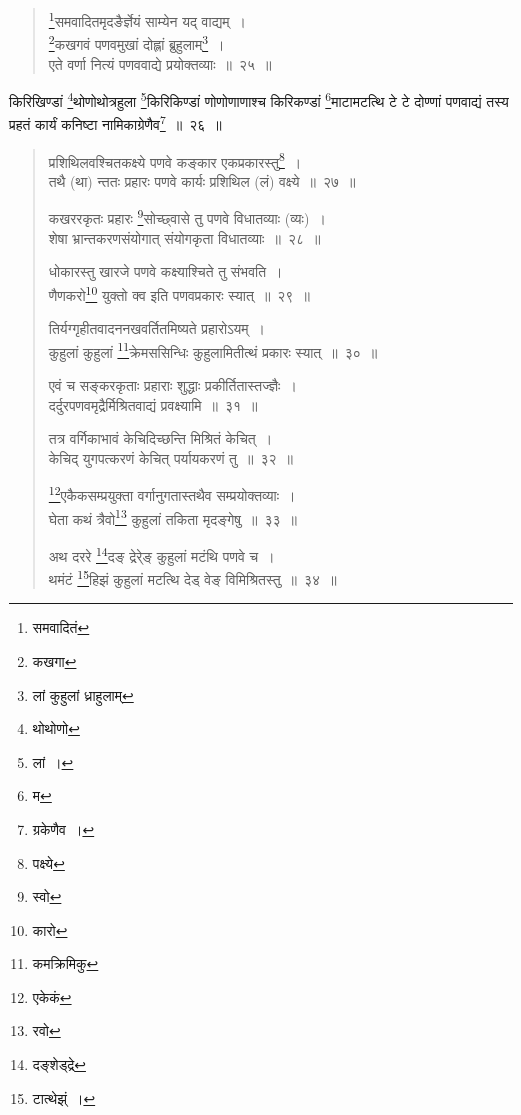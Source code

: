 \documentclass[11pt, openany]{book}
\begin{document}
\newpage

\begin{quote}
{\na \renewcommand{\thefootnote}{1}\footnote{समवादितं}समवादितमृदङैर्ज्ञेयं साम्येन यद् वाद्यम्~।\\
 \renewcommand{\thefootnote}{2}\footnote{कखगा}कखगवं पणवमुखां दोह्लां ब्रुहुलाम्\renewcommand{\thefootnote}{3}\footnote{लां कुहुलां ध्राहुलाम्}~।\\
 एते वर्णा नित्यं पणववाद्ये प्रयोक्तव्याः~॥~२५~॥}
\end{quote}

\noindent
{\qt किरिखिण्डां \renewcommand{\thefootnote}{4}\footnote{थोथोणो}थोणोथोत्रहुला \renewcommand{\thefootnote}{5}\footnote{लां~।}किरिकिण्डां णोणोणाणाश्च किरिकण्डां \renewcommand{\thefootnote}{6}\footnote{म}माटामटत्थि टे टे दोण्णां पणवाद्यं तस्य प्रहतं कार्यं कनिष्टा नामिकाग्रेणैव\renewcommand{\thefootnote}{7}\footnote{ग्रकेणैव~।}~॥~२६~॥}

\begin{quote}
{\na  प्रशिथिलवश्चितकक्ष्ये पणवे कङ्कार एकप्रकारस्तु\renewcommand{\thefootnote}{8}\footnote{पक्ष्ये}~।\\
 तथै (था) न्ततः प्रहारः पणवे कार्यः प्रशिथिल (लं) वक्ष्ये~॥~२७~॥

 कखररकृतः प्रहारः \renewcommand{\thefootnote}{9}\footnote{स्वो}सोच्छ्वासे तु पणवे विधातव्याः (व्यः)~।\\
 शेषा भ्रान्तकरणसंयोगात् संयोगकृता विधातव्याः~॥~२८~॥

 धोकारस्तु खारजे पणवे कक्ष्याश्चिते तु संभवति~।\\
 णैणकरो\renewcommand{\thefootnote}{10}\footnote{कारो} युक्तो क्व इति पणवप्रकारः स्यात्~॥~२९~॥

 तिर्यग्गृहीतवादननखवर्तितमिष्यते प्रहारोऽयम्~।\\
 कुहुलां कुहुलां \renewcommand{\thefootnote}{11}\footnote{कमक्रिमिकु}क्रेमससिन्धिः कुहुलामितीत्थं प्रकारः स्यात्~॥~३०~॥

 एवं च सङ्करकृताः प्रहाराः शुद्धाः प्रकीर्तितास्तज्ज्ञैः~।\\
 दर्दुरपणवमृद्रैर्मिश्रितवाद्यं प्रवक्ष्यामि~॥~३१~॥

 तत्र वर्गिकाभावं केचिदिच्छन्ति मिश्रितं केचित्~।\\
 केचिद् युगपत्करणं केचित् पर्यायकरणं तु~॥~३२~॥

 \renewcommand{\thefootnote}{12}\footnote{एकेकं}एकैकसम्प्रयुक्ता वर्गानुगतास्तथैव सम्प्रयोक्तव्याः~।\\
 घेता कथं त्रैवो\renewcommand{\thefootnote}{13}\footnote{रवो} कुहुलां तकिता मृदङ्गेषु~॥~३३~॥

 अथ दररे \renewcommand{\thefootnote}{14}\footnote{दङ्शेड्द्रे}दङ् द्रेरे्ङ् कुहुलां मटंथि पणवे च~।\\
 थमंटं \renewcommand{\thefootnote}{15}\footnote{टात्थेझ्ं~।}हिझं कुहुलां मटत्थि देड् वेङ् विमिश्रितस्तु~॥~३४~॥}
\end{quote}
\end{document}
